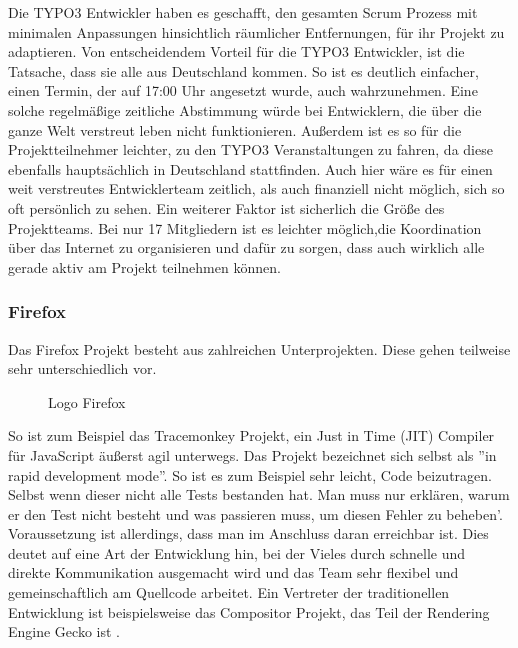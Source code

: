 Die TYPO3 Entwickler haben es geschafft, den gesamten Scrum Prozess mit minimalen Anpassungen hinsichtlich räumlicher Entfernungen, für ihr Projekt zu adaptieren. Von entscheidendem Vorteil für die TYPO3 Entwickler, ist die Tatsache, dass sie alle aus Deutschland kommen. So ist es deutlich einfacher, einen Termin, der auf 17:00 Uhr angesetzt wurde, auch wahrzunehmen. Eine solche regelmäßige zeitliche Abstimmung würde bei Entwicklern, die über die ganze Welt verstreut leben nicht funktionieren. Außerdem ist es so für die Projektteilnehmer leichter, zu den TYPO3 Veranstaltungen zu fahren, da diese ebenfalls hauptsächlich in Deutschland stattfinden. Auch hier wäre es für einen weit verstreutes Entwicklerteam zeitlich, als auch  finanziell nicht möglich, sich so oft persönlich zu sehen. Ein weiterer Faktor ist sicherlich die Größe des Projektteams. Bei nur 17 Mitgliedern ist es leichter möglich,die Koordination über das Internet zu  organisieren und dafür zu sorgen, dass auch wirklich alle gerade aktiv am Projekt teilnehmen können.

\subsubsection{Firefox}
Das Firefox Projekt besteht aus zahlreichen Unterprojekten. Diese gehen teilweise sehr unterschiedlich vor.
\begin{figure}[h]
	\centering
	\caption{Logo Firefox\cite{bib:logo-firefox}}
	\label{fireLogo}
\end{figure}
So ist zum Beispiel das Tracemonkey Projekt, ein Just in Time (JIT) Compiler für JavaScript äußerst agil unterwegs. Das Projekt bezeichnet sich selbst als ''in rapid development mode''\cite{bib:trm}. So ist es zum Beispiel sehr leicht, Code beizutragen. Selbst wenn dieser nicht alle Tests bestanden hat. Man muss nur erklären, warum er den Test nicht besteht und was passieren muss, um diesen Fehler zu beheben'\cite{bib:trm}. Voraussetzung ist allerdings, dass man im Anschluss daran erreichbar ist. Dies deutet auf eine Art der Entwicklung hin,  bei der Vieles durch schnelle und direkte Kommunikation ausgemacht wird und das Team sehr flexibel und gemeinschaftlich am Quellcode arbeitet.  Ein Vertreter der traditionellen Entwicklung ist beispielsweise das  Compositor Projekt, das  Teil der Rendering Engine Gecko ist \cite{bib:beltzner}.

